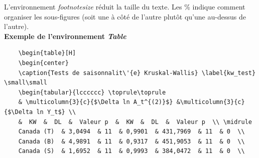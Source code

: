 \documentclass[12pt]{article}
\begin{document}
	L'environnement \textit{footnotesize} réduit la taille du texte. Les \% indique comment organiser les sous-figures (soit une à côté de l'autre plutôt qu'une au-dessus de l'autre). \\
	
	\textbf{Exemple de l'environnement \textit{Table}} \\
	
	\begin{lstlisting}
	\begin{table}[H]
	\begin{center}
	\caption{Tests de saisonnalit\'{e} Kruskal-Wallis} \label{kw_test}  \small\small                                                                                                                                                                                                    
	\begin{tabular}{lcccccc} \toprule\toprule                                                                                                                                                                                                                                           
	& \multicolumn{3}{c}{$\Delta ln A_t^{(2)}$} &\multicolumn{3}{c}{$\Delta ln Y_t$} \\                                                                                                                                                                                                 
	&  KW  &  DL  &  Valeur p  &  KW  &  DL  &  Valeur p  \\ \midrule                                                                                                                                                                                                                   
	Canada (T)  & 3,0494  & 11  & 0,9901  & 431,7969  & 11  & 0  \\                                                                                                                                                                                                                     
	Canada (B)  & 4,9891  & 11  & 0,9317  & 451,9053  & 11  & 0  \\                                                                                                                                                                                                                     
	Canada (S)  & 1,6952  & 11  & 0,9993  & 384,0472  & 11  & 0  \\                                                                                                                                                                                                                     

\end{lstlisting}
\end{document}
